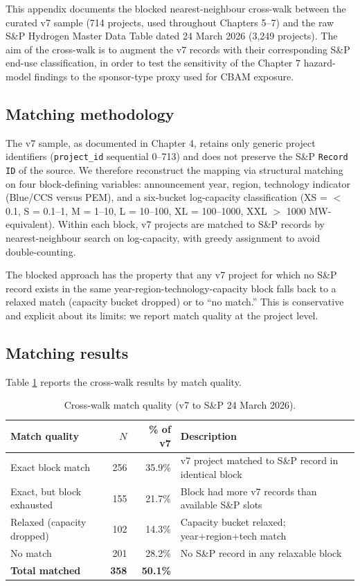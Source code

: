 \documentclass[11pt,a4paper]{article}
\begin{document}
This appendix documents the blocked nearest-neighbour cross-walk between the curated v7 sample (714 projects, used throughout Chapters 5--7) and the raw S\&P Hydrogen Master Data Table dated 24 March 2026 (3{,}249 projects). The aim of the cross-walk is to augment the v7 records with their corresponding S\&P end-use classification, in order to test the sensitivity of the Chapter 7 hazard-model findings to the sponsor-type proxy used for CBAM exposure.

\subsection{Matching methodology}
\label{app:matching-method}

The v7 sample, as documented in Chapter 4, retains only generic project identifiers (\texttt{project\_id} sequential 0--713) and does not preserve the S\&P \texttt{Record ID} of the source. We therefore reconstruct the mapping via structural matching on four block-defining variables: announcement year, region, technology indicator (Blue/CCS versus PEM), and a six-bucket log-capacity classification (XS = $<$0.1, S = 0.1--1, M = 1--10, L = 10--100, XL = 100--1000, XXL $>$ 1000 MW-equivalent). Within each block, v7 projects are matched to S\&P records by nearest-neighbour search on log-capacity, with greedy assignment to avoid double-counting.

The blocked approach has the property that any v7 project for which no S\&P record exists in the same year-region-technology-capacity block falls back to a relaxed match (capacity bucket dropped) or to ``no match.'' This is conservative and explicit about its limits: we report match quality at the project level.

\subsection{Matching results}

Table \ref{tab:app-matching-quality} reports the cross-walk results by match quality.

\begin{table}[ht]
\centering
\caption{Cross-walk match quality (v7 to S\&P 24 March 2026).}
\label{tab:app-matching-quality}
\begin{tabular}{lrrl}
\toprule
Match quality & $N$ & \% of v7 & Description \\
\midrule
Exact block match           & 256 & 35.9\% & v7 project matched to S\&P record in identical block \\
Exact, but block exhausted  & 155 & 21.7\% & Block had more v7 records than available S\&P slots \\
Relaxed (capacity dropped)  & 102 & 14.3\% & Capacity bucket relaxed; year+region+tech match \\
No match                    & 201 & 28.2\% & No S\&P record in any relaxable block \\
\midrule
\textbf{Total matched}      & \textbf{358} & \textbf{50.1\%} & \\
\bottomrule
\end{tabular}
\end{table}
\end{document}
